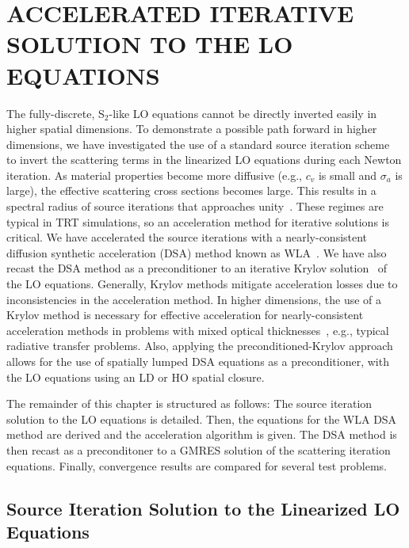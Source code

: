 
\chapter{\uppercase {Accelerated Iterative Solution to the LO Equations}}
\label{chp:dsa}

The fully-discrete, S$_2$-like LO equations 
cannot be directly inverted easily in higher spatial dimensions.  
To demonstrate a possible path forward in
higher dimensions, we have investigated the use of a standard
source iteration scheme~\cite{lewis} to invert the scattering terms in the linearized LO
equations during each Newton iteration.  As
material properties become more diffusive (e.g., $c_v$ is small and $\sigma_a$ is
large), the effective scattering cross sections becomes large.  This results in a spectral radius of source iterations that approaches
unity~\cite{morel_ldtrt}.  These regimes are typical in TRT simulations, so an
acceleration method for iterative solutions is critical. 
We have accelerated the source iterations with a nearly-consistent diffusion synthetic acceleration
(DSA) method known as WLA~\cite{wla,wla_thesis}. We have also recast the DSA method as a preconditioner to an iterative
Krylov solution~\cite{larson_morel_sn} of the LO equations.  Generally, Krylov
methods mitigate acceleration losses due to inconsistencies in the acceleration
method.  In higher dimensions, the use of a Krylov method is necessary for effective
acceleration for nearly-consistent acceleration methods in problems with
mixed optical thicknesses~\cite{larson_morel_sn}, e.g., typical radiative transfer
problems.  Also, applying the preconditioned-Krylov approach allows for the use of
spatially lumped DSA equations as a preconditioner, with the LO equations using an LD or
HO spatial closure.

The remainder of this chapter is structured as follows:  The source
iteration solution to the LO equations is detailed.  Then, the equations for the WLA DSA
method are derived and the acceleration algorithm is given.  The DSA method is then recast
as a preconditoner to a GMRES solution of the scattering iteration equations.  Finally,
convergence results are compared for several test problems.

\section{Source Iteration Solution to the Linearized LO Equations}
\label{sec:si}

